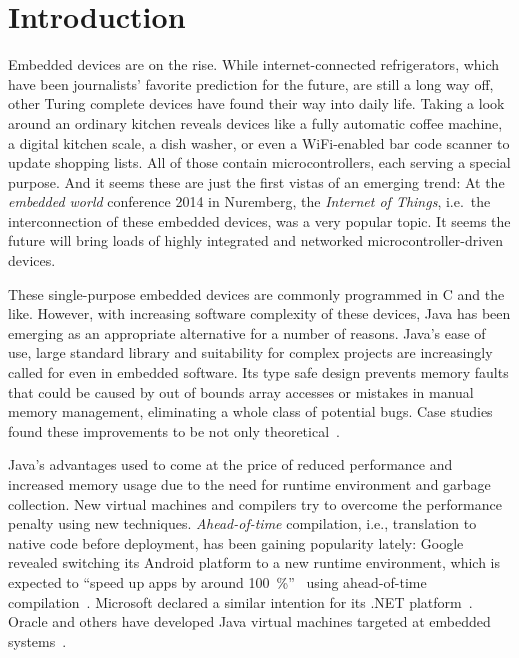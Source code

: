 
\chapter{Introduction}
	\label{chapter:intro}
	Embedded devices are on the rise. While internet-connected refrigerators, which have been journalists' favorite
	prediction for the future, are still a long way off, other Turing complete devices have found their way into daily
	life. Taking a look around an ordinary kitchen reveals devices like a fully automatic coffee machine, a digital
	kitchen scale, a dish washer, or even a WiFi-enabled bar code scanner to update shopping lists. All of those contain
	microcontrollers, each serving a special purpose. And it seems these are just the first vistas of an emerging trend:
	At the \emph{embedded world} conference 2014 in Nuremberg, the \emph{Internet of Things}, i.e.\ the interconnection of
	these embedded devices, was a very popular topic. It seems the future will bring loads of highly integrated and
	networked microcontroller-driven devices.


	These single-purpose embedded devices are commonly programmed in C and the like. However, with increasing software
	complexity of these devices, Java has been emerging as an appropriate alternative for a number of reasons. Java's ease
	of use, large standard library and suitability for complex projects are increasingly called for even in embedded
	software. Its type safe design prevents memory faults that could be caused by out of bounds array accesses or mistakes
	in manual memory management, eliminating a whole class of potential bugs. Case studies found these improvements to be
	not only theoretical~\cite{phipps:99:spe}.

	Java's advantages used to come at the price of reduced performance and increased memory usage due to the need for
	runtime environment and garbage collection. New virtual machines and compilers try to overcome the performance penalty
	using new techniques. \emph{Ahead-of-time} compilation, i.e., translation to native code before deployment, has been
	gaining popularity lately: Google revealed switching its Android platform to a new runtime environment, which is
	expected to \enquote{speed up apps by around 100~\%}~\cite{anthony:13:android-art} using ahead-of-time
	compilation~\cite{lindner:14:android-art}. Microsoft declared a similar intention for its .NET
	platform~\cite{lardinois:14:dotnet-aot}. Oracle and others have developed Java virtual machines targeted at embedded
	systems~\cite{merritt:13:java-for-IoT, maxfield:12:IS2T-JVM}.

